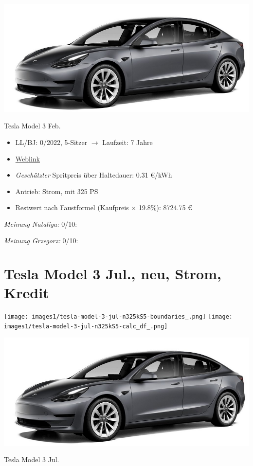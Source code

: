 \documentclass[landscape, DIV=99, 14pt]{scrartcl}
\begin{document}
\pagebreak
\begin{center}
\includegraphics[width=0.9\columnwidth]{cars/tesla-model-3.jpg}

Tesla Model 3 Feb.
\end{center}

\begin{itemize}
    \item LL/BJ: 0/2022, 5-Sitzer $\rightarrow$ Laufzeit: 7 Jahre
    \item \href{https://www.tesla.com/de_de/model3/design\#overview}{Weblink}
    \item \emph{Gesch\"atzter} Spritpreis \"uber Haltedauer: 0.31 \euro{}/kWh
    \item Antrieb: Strom, mit 325 PS
    \item Restwert nach Faustformel (Kaufpreis $\times$ 19.8\%): 8724.75 \euro{}
\end{itemize}

\begin{small}
\emph{Meinung Nataliya:} 0/10: 
        
\emph{Meinung Grzegorz:} 0/10: 
\end{small}

\pagebreak


\twocolumn

\section*{Tesla Model 3 Jul., neu, Strom, Kredit}
\begin{center}
\texttt{[image: images1/tesla-model-3-jul-n325kS5-boundaries\_.png]}
\null
\vspace{0.5cm}
\texttt{[image: images1/tesla-model-3-jul-n325kS5-calc\_df\_.png]}
\end{center}

\pagebreak
\begin{center}
\includegraphics[width=0.9\columnwidth]{cars/tesla-model-3.jpg}

Tesla Model 3 Jul.
\end{center}
\end{document}
